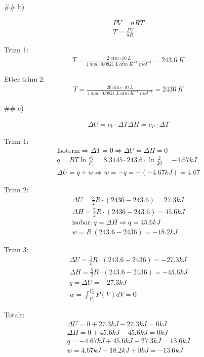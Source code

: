 ## b)

\begin{gather*}
	P V = n R T
	\\
	T = \frac{PV}{nR}
\end{gather*}

Trinn 1:
\begin{gather*}
	T = \frac{2\ atm ⋅ 10\ L}{1\ mol ⋅ 0.0821\ L\ atm\ K^{-1}\ mol^{-1}}
	= 243.6\ K
\end{gather*}

Etter trinn 2:
\begin{gather*}
	T = \frac{20\ atm ⋅ 10\ L}{1\ mol ⋅ 0.0821\ L\ atm\ K^{-1}\ mol^{-1}}
	= 2436\ K
\end{gather*}

## c)

\begin{gather*}
	\Delta U = c_V ⋅ \Delta T
	\Delta H = c_P ⋅ \Delta T
\end{gather*}

Trinn 1:
\begin{gather*}
	\text{Isoterm} ⇒ ΔT = 0 ⇒ ΔU = ΔH = 0
	\\
	q = R T \ln{\frac{P_1}{P_2}}
	= 8.3145 ⋅ 243.6 ⋅ \ln{\frac{2}{20}} = -4.67 kJ
	\\
	ΔU = q + w ⇒ w = -q = - (- 4.67 kJ) = 4.67
\end{gather*}

Trinn 2:
\begin{gather*}
	\Delta U = \frac{3}{2} R ⋅ (2436 - 243.6) = 27.3 kJ
	\\
	\Delta H = \frac{5}{2} R ⋅ (2436 - 243.6) = 45.6 kJ
	\\
	\text{isobar:}\ q = \Delta H ⇒ q = 45.6 kJ
	\\
	w = R\ (243.6 - 2436) = -18.2 kJ
\end{gather*}


Trinn 3:
\begin{gather*}
	\Delta U = \frac{3}{2} R ⋅ (243.6 - 2436) = - 27.3 kJ
	\\
	\Delta H = \frac{5}{2} R ⋅ (243.6 - 2436) = - 45.6 kJ
	\\
	q = \Delta U = - 27.3kJ
	\\
	w = \int_{V_1}^{V_2}{P(V) dV} = 0
\end{gather*}


Totalt:
\begin{gather*}
	\Delta U = 0 + 27.3 kJ - 27.3 kJ = 0 kJ
	\\
	\Delta H = 0 + 45.6 kJ - 45.6 kJ = 0 kJ
	\\
	q = -4.67 kJ + 45.6 kJ - 27.3 kJ = 13.6 kJ
	\\
	w = 4.67 kJ - 18.2 kJ + 0 kJ = -13.6 kJ
\end{gather*}
